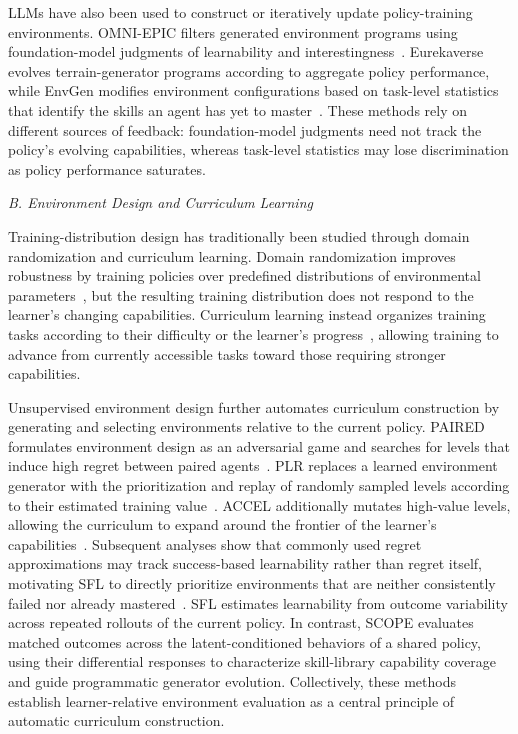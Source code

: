 \documentclass[conference]{IEEEtran}
\begin{document}
LLMs have also been used to construct or iteratively update policy-training
environments. OMNI-EPIC filters generated environment programs using
foundation-model judgments of learnability and
interestingness~\cite{omniepic}. Eurekaverse evolves terrain-generator
programs according to aggregate policy performance, while EnvGen modifies
environment configurations based on task-level statistics that identify the
skills an agent has yet to master~\cite{eurekaverse,envgen}. These methods rely
on different sources of feedback: foundation-model judgments need not track the
policy's evolving capabilities, whereas task-level statistics may lose
discrimination as policy performance saturates.

\textit{B. Environment Design and Curriculum Learning}

Training-distribution design has traditionally been studied through domain
randomization and curriculum learning. Domain randomization improves robustness
by training policies over predefined distributions of environmental
parameters~\cite{tobin2017domain}, but the resulting training distribution does
not respond to the learner's changing capabilities. Curriculum learning instead
organizes training tasks according to their difficulty or the learner's
progress~\cite{bengio2009curriculum,matiisen2020teacher,
portelas2020teacher}, allowing training to advance from currently accessible
tasks toward those requiring stronger capabilities.

Unsupervised environment design further automates curriculum construction by
generating and selecting environments relative to the current policy. PAIRED
formulates environment design as an adversarial game and searches for levels
that induce high regret between paired agents~\cite{paired}. PLR replaces a
learned environment generator with the prioritization and replay of randomly
sampled levels according to their estimated training
value~\cite{jiang2021plr}. ACCEL additionally mutates high-value levels,
allowing the curriculum to expand around the frontier of the learner's
capabilities~\cite{accel}. Subsequent analyses show that commonly used regret
approximations may track success-based learnability rather than regret itself,
motivating SFL to directly prioritize environments that are neither
consistently failed nor already mastered~\cite{sfl}. SFL estimates learnability
from outcome variability across repeated rollouts of the current policy. In
contrast, SCOPE evaluates matched outcomes across the latent-conditioned
behaviors of a shared policy, using their differential responses to characterize
skill-library capability coverage and guide programmatic generator evolution.
Collectively, these methods establish learner-relative environment evaluation
as a central principle of automatic curriculum construction.
\end{document}
